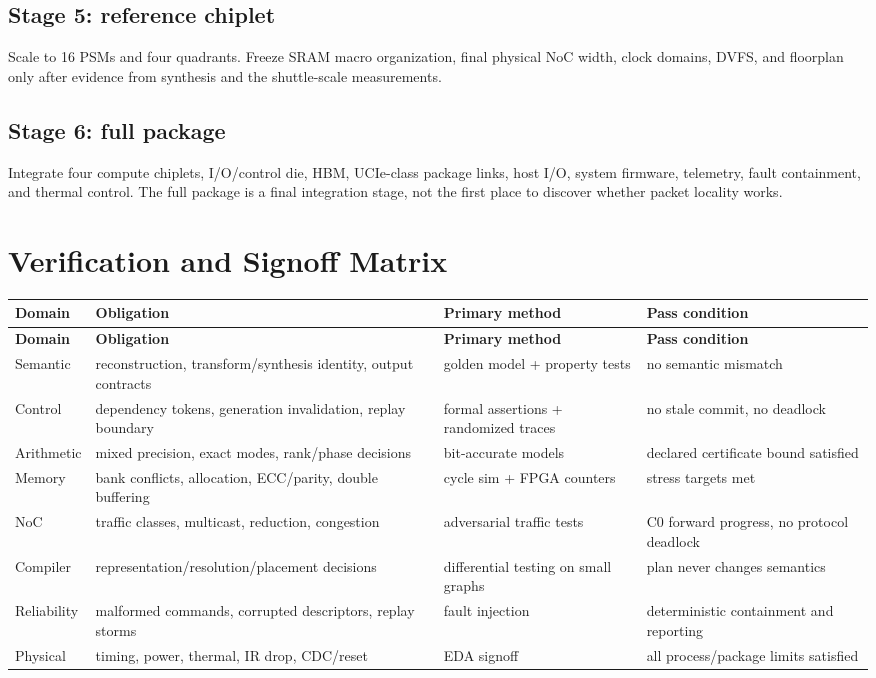 \documentclass[10pt,letterpaper]{article}
\begin{document}
{{\subsection{Stage 5: reference chiplet}

Scale to 16 PSMs and four quadrants. Freeze SRAM macro organization, final physical NoC width, clock domains, DVFS, and floorplan only after evidence from synthesis and the shuttle-scale measurements.

\subsection{Stage 6: full package}

Integrate four compute chiplets, I/O/control die, HBM, UCIe-class package links, host I/O, system firmware, telemetry, fault containment, and thermal control. The full package is a final integration stage, not the first place to discover whether packet locality works.

\section{Verification and Signoff Matrix}

{\small\begin{longtable}{p{0.82in}p{2.00in}p{1.67in}p{1.65in}}
\toprule
\textbf{Domain} & \textbf{Obligation} & \textbf{Primary method} & \textbf{Pass condition}\\
\midrule
\endfirsthead
\toprule
\textbf{Domain} & \textbf{Obligation} & \textbf{Primary method} & \textbf{Pass condition}\\
\midrule
\endhead
Semantic & reconstruction, transform/synthesis identity, output contracts & golden model + property tests & no semantic mismatch\\
Control & dependency tokens, generation invalidation, replay boundary & formal assertions + randomized traces & no stale commit, no deadlock\\
Arithmetic & mixed precision, exact modes, rank/phase decisions & bit-accurate models & declared certificate bound satisfied\\
Memory & bank conflicts, allocation, ECC/parity, double buffering & cycle sim + FPGA counters & stress targets met\\
NoC & traffic classes, multicast, reduction, congestion & adversarial traffic tests & C0 forward progress, no protocol deadlock\\
Compiler & representation/resolution/placement decisions & differential testing on small graphs & plan never changes semantics\\
Reliability & malformed commands, corrupted descriptors, replay storms & fault injection & deterministic containment and reporting\\
Physical & timing, power, thermal, IR drop, CDC/reset & EDA signoff & all process/package limits satisfied\\
\bottomrule
\end{longtable}

}}}
\end{document}
